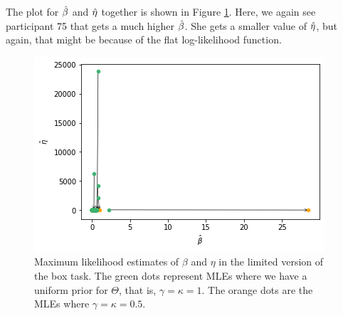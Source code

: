 The plot for $\hat{\beta}$ and $\hat{\eta}$ together is shown in Figure \ref{fig:sensitivity_mles_lim_b_e}. Here, we again see participant 75 that gets a much higher $\hat{\beta}$. She gets a smaller value of $\hat{\eta}$, but again, that might be because of the flat log-likelihood function. 
\begin{figure}
    \centering
    \includegraphics[scale=0.8]{pictures/Sensitivity/mles_lim_b_e.png}
    \caption[MLEs of $\beta$ and $\eta$ for prior with $\gamma=\kappa=1$ and $\gamma=\kappa=0.5$, limited]{
    Maximum likelihood estimates of $\beta$ and $\eta$ in the limited version of the box task. The green dots represent MLEs where we have a uniform prior for $\Theta$, that is, $\gamma=\kappa=1$. The orange dots are the MLEs where $\gamma=\kappa=0.5$.}
    \label{fig:sensitivity_mles_lim_b_e}
\end{figure}

